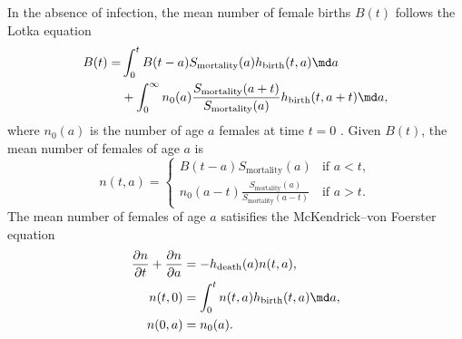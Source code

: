 \documentclass{jpmarticle}
\begin{document}
In the absence of infection, the mean number of female births $B(t)$
follows the Lotka equation
\begin{equation}
  \label{lotka}
  \begin{split}
    B(t) =&
    \int_0^t B(t - a) S_{\text{mortality}}(a) h_{\text{birth}}(t, a) \md a
    \\
    & {} +
    \int_0^{\infty} n_0(a) \frac{S_{\text{mortality}}(a +
      t)}{S_{\text{mortality}}(a)} h_{\text{birth}}(t, a + t) \md a,
  \end{split}
\end{equation}
where $n_0(a)$ is the number of age $a$ females at time $t = 0$
\citetext{\citealp[Chapter VI, Section 29 on
  pp.~159--161]{harris_1963};
  \citealp[Chapter 20 on pp.~353--364]{kot_01}}.
Given $B(t)$, the mean number of females of age $a$ is
\begin{equation}
  n(t, a) =
  \begin{cases}
    B(t - a) S_{\text{mortality}}(a)
    & \text{if $a < t$},
    \\
    n_0(a - t)
    \frac{S_{\text{mortality}}(a)}{S_{\text{mortality}}(a - t)}
    & \text{if $a > t$}.
  \end{cases}
\end{equation}
The mean number of females of age $a$ satisifies the McKendrick--von
Foerster equation
\begin{equation}
  \begin{split}
    \frac{\partial n}{\partial t} + \frac{\partial n}{\partial a}
    &= - h_{\text{death}}(a) n(t, a),
    \\
    n(t, 0) &= \int_0^t n(t, a) h_{\text{birth}}(t, a) \md a,
    \\
    n(0, a) &= n_0(a).
  \end{split}
\end{equation}
\end{document}
